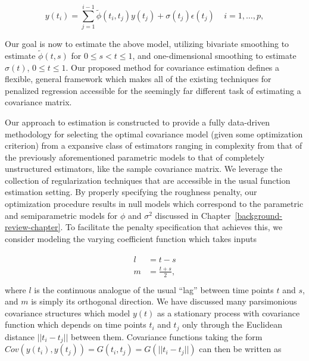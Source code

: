 \begin{equation}  \label{eq:cholesky-regression-model-1} 
y\left(t_{i} \right)  = \sum_{j=1}^{i-1} \tilde{\phi}\left(t_{i} ,t_{j}\right) y\left(t_{j}\right) + \sigma\left(t_{j}\right)\epsilon\left({t_j}\right) \;\;\;\; i=1,\dots, p, 
\end{equation}
\noindent

Our goal is now to estimate the above model, utilizing bivariate smoothing to estimate $\tilde{\phi}\left(t,s\right)$ for $0 \le s < t \le 1$,  and one-dimensional smoothing to estimate $\sigma\left(t \right)$, $0 \le t \le 1$. Our proposed method for covariance estimation defines a flexible, general framework which makes all of the existing techniques for penalized regression accessible for the seemingly far different task of estimating a covariance matrix.

\bigskip

Our approach to estimation is constructed to provide a fully data-driven methodology for selecting the optimal covariance model (given some optimization criterion) from a expansive class of estimators ranging in complexity from that of the previously aforementioned parametric models to that of completely unstructured estimators, like the sample covariance matrix. We leverage the collection of regularization techniques that are accessible in the usual function estimation setting. By properly specifying the roughness penalty, our optimization procedure results in null models which correspond to the parametric and semiparametric models for $\phi$ and $\sigma^2$ discussed in Chapter~\ref{background-review-chapter}. To facilitate the penalty specification that achieves this, we consider modeling the varying coefficient function which takes inputs

\begin{align} 
\begin{split}\label{eq:l-m-transformation}
l &= t - s \\
m &= \frac{t + s}{2}, \\
\end{split}
\end{align}
\noindent
 where $l$ is the continuous analogue of the usual ``lag'' between time points $t$ and $s$, and $m$ is simply its orthogonal direction. We have discussed many parsimonious covariance structures which model $y\left(t\right)$ as a stationary process with covariance function which depends on time points $t_i$ and $t_j$ only through the Euclidean distance $\vert \vert t_i - t_j \vert \vert$ between them. Covariance functions taking the form $Cov\left(y\left( t_i \right),y\left( t_j \right)\right) =G\left(t_i,t_j\right) = G\left(\vert \vert t_i - t_j \vert \vert \right)$ can then be written as 

